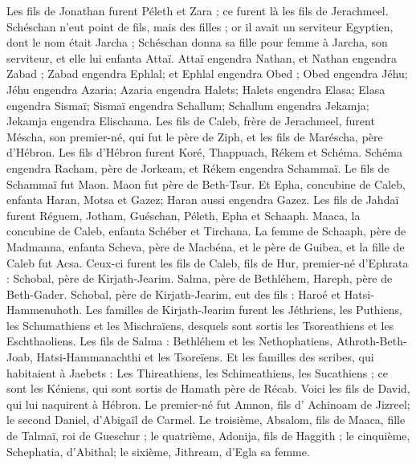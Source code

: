\begin{multicols}{2}
Les fils de Jonathan furent Péleth et Zara ; ce furent là les fils de Jerachmeel.
Schéschan n'eut point de fils, mais des filles ; or il avait un serviteur Egyptien, dont le nom était Jarcha ;
Schéschan donna sa fille pour femme à Jarcha, son serviteur, et elle lui enfanta Attaï.
Attaï engendra Nathan, et Nathan engendra Zabad ;
Zabad engendra Ephlal; et Ephlal engendra Obed ;
 Obed engendra Jéhu; Jéhu engendra Azaria;
Azaria engendra Halets; Halets engendra Elasa;
Elasa engendra Sismaï; Sismaï engendra Schallum;
Schallum engendra Jekamja; Jekamja engendra Elischama.
Les fils de Caleb, frère de Jerachmeel, furent Méscha, son premier-né, qui fut le père de Ziph, et les fils de Maréscha, père d'Hébron.
Les fils d'Hébron furent Koré, Thappuach, Rékem et Schéma.
Schéma engendra Racham, père de Jorkeam, et Rékem engendra Schammaï.
Le fils de Schammaï fut Maon. Maon fut père de Beth-Tsur.
Et Epha, concubine de Caleb, enfanta Haran, Motsa et Gazez; Haran aussi engendra Gazez.
Les fils de Jahdaï furent Réguem, Jotham, Guéschan, Péleth, Epha et Schaaph.
Maaca, la concubine de Caleb, enfanta Schéber et Tirchana.
La femme de Schaaph, père de Madmanna, enfanta Scheva, père de Macbéna, et le père de Guibea, et la fille de Caleb fut Acsa.
Ceux-ci furent les fils de Caleb, fils de Hur, premier-né d'Ephrata : Schobal, père de Kirjath-Jearim.
Salma, père de Bethléhem, Hareph, père de Beth-Gader.
Schobal, père de Kirjath-Jearim, eut des fils : Haroé et Hatsi-Hammenuhoth.
Les familles de Kirjath-Jearim furent les Jéthriens, les Puthiens, les Schumathiens et les Mischraïens, desquels sont sortis les Tsoreathiens et les Eschthaoliens.
Les fils de Salma : Bethléhem et les Nethophatiens, Athroth-Beth-Joab, Hatsi-Hammanachthi et les Tsoreïens.
Et les familles des scribes, qui habitaient à Jaebets : Les Thireathiens, les Schimeathiens, les Sucathiens ; ce sont les Kéniens, qui sont sortis de Hamath père de Récab.
\VerseOne{}Voici les fils de David, qui lui naquirent à Hébron. Le premier-né fut Amnon, fils d' Achinoam de Jizreel; le second Daniel, d'Abigaïl de Carmel.
Le troisième, Absalom, fils de Maaca, fille de Talmaï, roi de Gueschur ; le quatrième, Adonija, fils de Haggith ;
le cinquième, Schephatia, d'Abithal; le sixième, Jithream, d'Egla sa femme.

\end{multicols}
